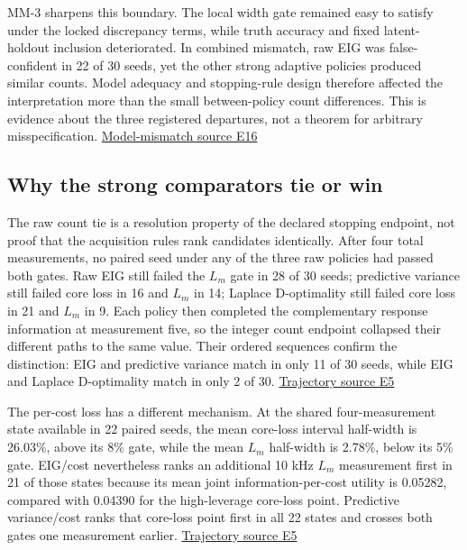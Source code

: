 MM-3 sharpens this boundary. The local width gate remained easy to
satisfy under the locked discrepancy terms, while truth accuracy and
fixed latent- holdout inclusion deteriorated. In combined mismatch, raw
EIG was false- confident in 22 of 30 seeds, yet the other strong
adaptive policies produced similar counts. Model adequacy and
stopping-rule design therefore affected the interpretation more than the
small between-policy count differences. This is evidence about the three
registered departures, not a theorem for arbitrary misspecification.
\href{https://github.com/hoangduong6210/EIG-bayesian-for-Recover-potential-Physical-Parameter-of-MagComponent/blob/a3e6326621d90123e5661c17e2d562fb0f5e0a41/wiki/evidence/Evidence-Sources.md\#e16}{Model-mismatch
source E16}

\hypertarget{why-the-strong-comparators-tie-or-win}{%
\subsection{Why the strong comparators tie or
win}\label{why-the-strong-comparators-tie-or-win}}

The raw count tie is a resolution property of the declared stopping
endpoint, not proof that the acquisition rules rank candidates
identically. After four total measurements, no paired seed under any of
the three raw policies had passed both gates. Raw EIG still failed the
\(L_m\) gate in 28 of 30 seeds; predictive variance still failed core
loss in 16 and \(L_m\) in 14; Laplace D-optimality still failed core
loss in 21 and \(L_m\) in 9. Each policy then completed the
complementary response information at measurement five, so the integer
count endpoint collapsed their different paths to the same value. Their
ordered sequences confirm the distinction: EIG and predictive variance
match in only 11 of 30 seeds, while EIG and Laplace D-optimality match
in only 2 of 30.
\href{https://github.com/hoangduong6210/EIG-bayesian-for-Recover-potential-Physical-Parameter-of-MagComponent/blob/a3e6326621d90123e5661c17e2d562fb0f5e0a41/wiki/evidence/Evidence-Sources.md\#e5}{Trajectory
source E5}

The per-cost loss has a different mechanism. At the shared
four-measurement state available in 22 paired seeds, the mean core-loss
interval half-width is 26.03\%, above its 8\% gate, while the mean
\(L_m\) half-width is 2.78\%, below its 5\% gate. EIG/cost nevertheless
ranks an additional 10 kHz \(L_m\) measurement first in 21 of those
states because its mean joint information-per-cost utility is 0.05282,
compared with 0.04390 for the high-leverage core-loss point. Predictive
variance/cost ranks that core-loss point first in all 22 states and
crosses both gates one measurement earlier.
\href{https://github.com/hoangduong6210/EIG-bayesian-for-Recover-potential-Physical-Parameter-of-MagComponent/blob/a3e6326621d90123e5661c17e2d562fb0f5e0a41/wiki/evidence/Evidence-Sources.md\#e5}{Trajectory
source E5}

